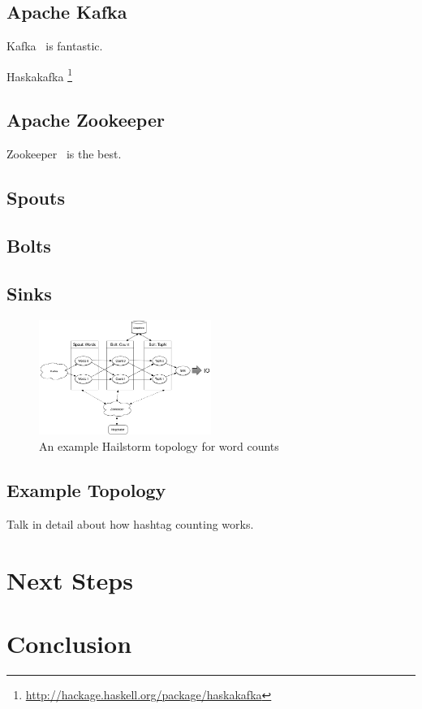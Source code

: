 \documentclass[10pt,nocopyrightspace]{sigplanconf}
\begin{document}
\subsection{Apache Kafka}
Kafka~\cite{kafka} is fantastic.

Haskakafka \footnote{\url{http://hackage.haskell.org/package/haskakafka}}

\subsection{Apache Zookeeper}
Zookeeper~\cite{zookeeper} is the best.

\subsection{Spouts}

\subsection{Bolts}

\subsection{Sinks}


\begin{figure}
\centering
\includegraphics[width=0.5\textwidth]{images/architecture.png}
\caption{An example Hailstorm topology for word counts}
\label{fig:topology}
\end{figure}

\subsection{Example Topology}
Talk in detail about how hashtag counting works.

\section{Next Steps}

\section{Conclusion}

{}

\end{document}
